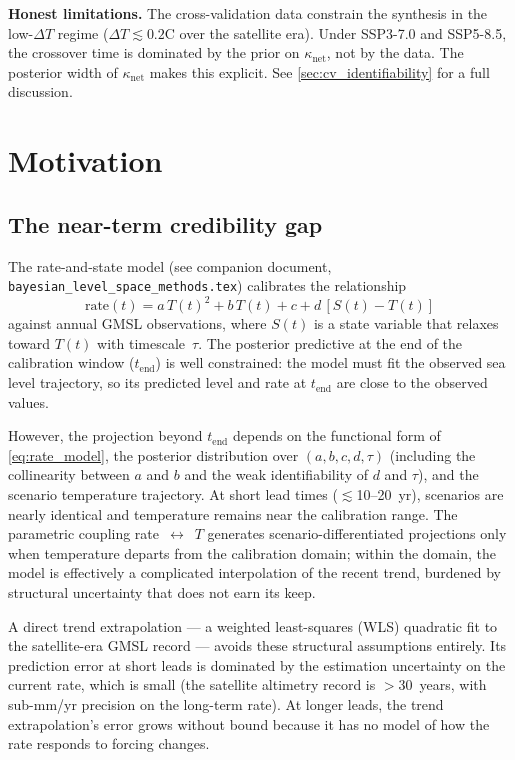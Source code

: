 \documentclass[11pt]{article}
\newcommand{\dT}{\Delta T}
\newcommand{\tend}{t_{\mathrm{end}}}
\begin{document}
\textbf{Honest limitations.}  The cross-validation data constrain the synthesis in the low-$\dT$ regime ($\dT \lesssim 0.2$\textdegree C over the satellite era).  Under SSP3-7.0 and SSP5-8.5, the crossover time is dominated by the prior on $\kappa_{\mathrm{net}}$, not by the data.  The posterior width of $\kappa_{\mathrm{net}}$ makes this explicit.  See \cref{sec:cv_identifiability} for a full discussion.


\section{Motivation}

\subsection{The near-term credibility gap}

The rate-and-state model (see companion document, \texttt{bayesian\_level\_space\_methods.tex}) calibrates the relationship
\begin{equation}
  \mathrm{rate}(t) = a\,T(t)^2 + b\,T(t) + c + d\,[S(t) - T(t)]
  \label{eq:rate_model}
\end{equation}
against annual GMSL observations, where $S(t)$ is a state variable that relaxes toward $T(t)$ with timescale~$\tau$.  The posterior predictive at the end of the calibration window ($\tend$) is well constrained: the model must fit the observed sea level trajectory, so its predicted level and rate at $\tend$ are close to the observed values.

However, the projection beyond $\tend$ depends on the functional form of \cref{eq:rate_model}, the posterior distribution over $(a, b, c, d, \tau)$ (including the collinearity between $a$ and $b$ and the weak identifiability of $d$ and $\tau$), and the scenario temperature trajectory.  At short lead times ($\lesssim$10--20~yr), scenarios are nearly identical and temperature remains near the calibration range.  The parametric coupling rate~$\leftrightarrow$~$T$ generates scenario-differentiated projections only when temperature departs from the calibration domain; within the domain, the model is effectively a complicated interpolation of the recent trend, burdened by structural uncertainty that does not earn its keep.

A direct trend extrapolation --- a weighted least-squares (WLS) quadratic fit to the satellite-era GMSL record --- avoids these structural assumptions entirely.  Its prediction error at short leads is dominated by the estimation uncertainty on the current rate, which is small (the satellite altimetry record is $>$30~years, with sub-mm/yr precision on the long-term rate).  At longer leads, the trend extrapolation's error grows without bound because it has no model of how the rate responds to forcing changes.
\end{document}

